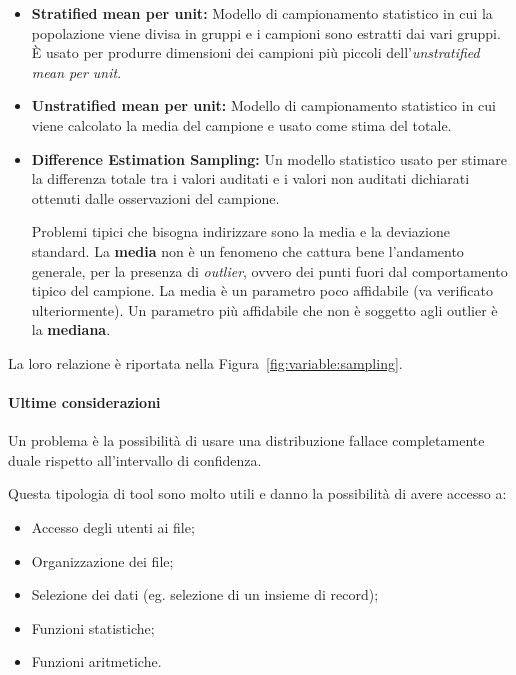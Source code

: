 \begin{itemize}
\item \textbf{Stratified mean per unit:}
Modello di campionamento statistico in cui la popolazione
viene divisa in gruppi e i campioni sono estratti dai vari
gruppi. È usato per produrre dimensioni dei campioni più piccoli
dell'\textit{unstratified mean per unit}.

\item \textbf{Unstratified mean per unit:}
Modello di campionamento statistico in cui viene calcolato la media
del campione e usato come stima del totale.


\item \textbf{Difference Estimation Sampling:} Un modello statistico
usato per stimare la differenza totale
tra i valori auditati e i valori non auditati dichiarati ottenuti
dalle osservazioni del campione.

Problemi tipici che bisogna indirizzare sono la media e la deviazione standard.
La \textbf{media} non è un fenomeno che cattura bene l'andamento generale, per la
presenza di \textit{outlier}, ovvero dei punti fuori dal comportamento
tipico del campione.
La media è un parametro poco affidabile (va verificato ulteriormente). Un
parametro più affidabile che non è soggetto agli
outlier è la \textbf{mediana}.
\end{itemize}

La loro relazione è riportata nella Figura~\ref{fig:variable:sampling}.


\paragraph*{Ultime considerazioni}
Un problema è la possibilità di usare una
distribuzione fallace completamente duale rispetto all'intervallo di
confidenza.



Questa tipologia di tool sono molto utili e danno la possibilità di avere
accesso a:
\begin{itemize}
\item Accesso degli utenti ai file;
\item Organizzazione dei file;
\item Selezione dei dati (eg. selezione di un insieme di record);
\item Funzioni statistiche;
\item Funzioni aritmetiche.
\end{itemize}

